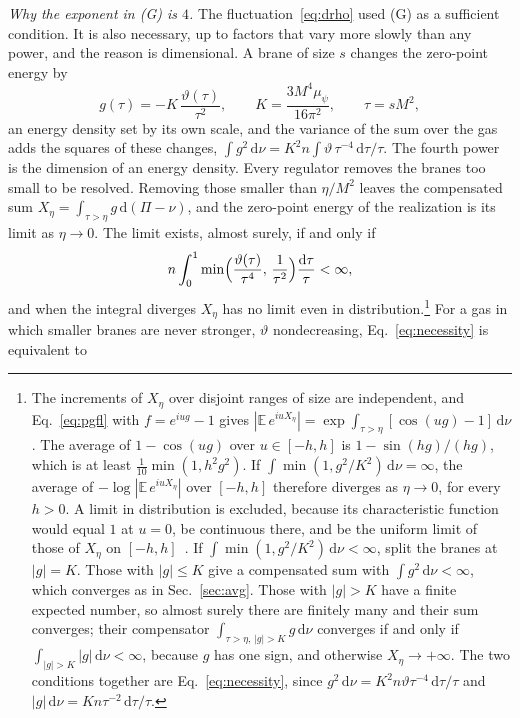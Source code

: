 \documentclass[aps,prd,10pt,twocolumn,superscriptaddress,nofootinbib,floatfix,longbibliography]{revtex4-2}
\newcommand{\bE}{\mathbb{E}}
\newcommand{\dd}{\mathrm{d}}
\begin{document}
\textit{Why the exponent in (G) is $4$.} The fluctuation~\eqref{eq:drho} used (G) as a sufficient condition. It is also necessary, up to factors that vary more slowly than any power, and the reason is dimensional. A brane of size $s$ changes the zero-point energy by
\[
g(\tau)=-K\,\frac{\vartheta(\tau)}{\tau^2},\qquad K=\frac{3M^4\mu_\psi}{16\pi^2},\qquad\tau=sM^2,
\]
an energy density set by its own scale, and the variance of the sum over the gas adds the squares of these changes, $\int g^2\,\dd\nu=K^2n\int\vartheta\,\tau^{-4}\,\dd\tau/\tau$. The fourth power is the dimension of an energy density. Every regulator removes the branes too small to be resolved. Removing those smaller than $\eta/M^2$ leaves the compensated sum $X_\eta=\int_{\tau>\eta}g\,\dd(\Pi-\nu)$, and the zero-point energy of the realization is its limit as $\eta\to0$. The limit exists, almost surely, if and only if
\begin{equation}
\label{eq:necessity}
n\int_0^1\min\Bigl(\frac{\vartheta(\tau)}{\tau^{4}},\,\frac1{\tau^{2}}\Bigr)\frac{\dd\tau}\tau<\infty ,
\end{equation}
and when the integral diverges $X_\eta$ has no limit even in distribution.\footnote{The increments of $X_\eta$ over disjoint ranges of size are independent, and Eq.~\eqref{eq:pgfl} with $f=e^{iug}-1$ gives $|\bE\,e^{iuX_\eta}|=\exp\int_{\tau>\eta}[\cos(ug)-1]\,\dd\nu$. The average of $1-\cos(ug)$ over $u\in[-h,h]$ is $1-\sin(hg)/(hg)$, which is at least $\frac1{10}\min(1,h^2g^2)$. If $\int\min(1,g^2/K^2)\,\dd\nu=\infty$, the average of $-\log|\bE\,e^{iuX_\eta}|$ over $[-h,h]$ therefore diverges as $\eta\to0$, for every $h>0$. A limit in distribution is excluded, because its characteristic function would equal $1$ at $u=0$, be continuous there, and be the uniform limit of those of $X_\eta$ on $[-h,h]$~\cite{Feller1971}. If $\int\min(1,g^2/K^2)\,\dd\nu<\infty$, split the branes at $|g|=K$. Those with $|g|\le K$ give a compensated sum with $\int g^2\,\dd\nu<\infty$, which converges as in Sec.~\ref{sec:avg}. Those with $|g|>K$ have a finite expected number, so almost surely there are finitely many and their sum converges; their compensator $\int_{\tau>\eta,\,|g|>K}g\,\dd\nu$ converges if and only if $\int_{|g|>K}|g|\,\dd\nu<\infty$, because $g$ has one sign, and otherwise $X_\eta\to+\infty$. The two conditions together are Eq.~\eqref{eq:necessity}, since $g^2\,\dd\nu=K^2n\vartheta\tau^{-4}\,\dd\tau/\tau$ and $|g|\,\dd\nu=Kn\tau^{-2}\,\dd\tau/\tau$.} For a gas in which smaller branes are never stronger, $\vartheta$ nondecreasing, Eq.~\eqref{eq:necessity} is equivalent to
\end{document}

